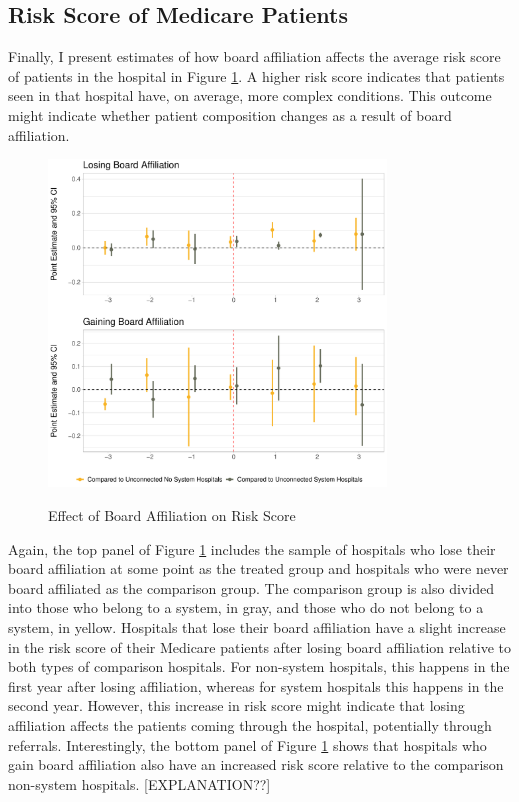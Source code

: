 \documentclass[12pt]{article}
\begin{document}
    \subsection{Risk Score of Medicare Patients}

    Finally, I present estimates of how board affiliation affects the average risk score of patients in the hospital in Figure \ref{fig:risk_did}. A higher risk score indicates that patients seen in that hospital have, on average, more complex conditions. This outcome might indicate whether patient composition changes as a result of board affiliation. 

    \begin{figure}[ht!]
        \centering
        \caption{Effect of Board Affiliation on Risk Score}
        \includegraphics[width=0.8\textwidth]{Objects/risk_did.pdf}
        \label{fig:risk_did}
    \end{figure}

    Again, the top panel of Figure \ref{fig:risk_did} includes the sample of hospitals who lose their board affiliation at some point as the treated group and hospitals who were never board affiliated as the comparison group. The comparison group is also divided into those who belong to a system, in gray, and those who do not belong to a system, in yellow. Hospitals that lose their board affiliation have a slight increase in the risk score of their Medicare patients after losing board affiliation relative to both types of comparison hospitals. For non-system hospitals, this happens in the first year after losing affiliation, whereas for system hospitals this happens in the second year. However, this increase in risk score might indicate that losing affiliation affects the patients coming through the hospital, potentially through referrals. Interestingly, the bottom panel of Figure \ref{fig:risk_did} shows that hospitals who gain board affiliation also have an increased risk score relative to the comparison non-system hospitals. [EXPLANATION??]

    

    \newpage


    \printbibliography


    

    

    

    

    

	
	
	
\end{document}
